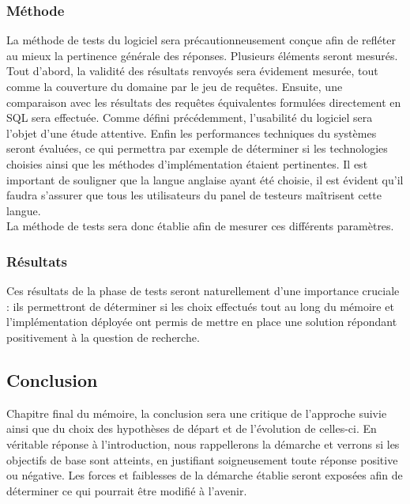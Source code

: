 \documentclass[a4paper,12pt]{article}
\begin{document}
\subsubsection{Méthode}
La méthode de tests du logiciel sera précautionneusement conçue afin de refléter au mieux la pertinence générale des réponses.
Plusieurs éléments seront mesurés.
Tout d'abord, la validité des résultats renvoyés sera évidement mesurée, tout comme la couverture du domaine par le jeu de requêtes.
Ensuite, une comparaison avec les résultats des requêtes équivalentes formulées directement en SQL sera effectuée.
Comme défini précédemment, l'usabilité du logiciel sera l'objet d'une étude attentive.
Enfin les performances techniques du systèmes seront évaluées, ce qui permettra par exemple de déterminer si les technologies choisies ainsi que les méthodes d'implémentation étaient pertinentes.
Il est important de souligner que la langue anglaise ayant été choisie, il est évident qu'il faudra s'assurer que tous les utilisateurs du panel de testeurs maîtrisent cette langue. \\

La méthode de tests sera donc établie afin de mesurer ces différents paramètres.
\subsubsection{Résultats}
Ces résultats de la phase de tests seront naturellement d'une importance cruciale : ils permettront de déterminer si les choix effectués tout au long du mémoire et l'implémentation déployée ont permis de mettre en place une solution répondant positivement à la question de recherche.
\subsection{Conclusion}
Chapitre final du mémoire, la conclusion sera une critique de l'approche suivie ainsi que du choix des hypothèses de départ et de l'évolution de celles-ci.
En véritable réponse à l'introduction, nous rappellerons la démarche et verrons si les objectifs de base sont atteints, en justifiant soigneusement toute réponse positive ou négative.
Les forces et faiblesses de la démarche établie seront exposées afin de déterminer ce qui pourrait être modifié à l'avenir.
\newpage
\end{document}
